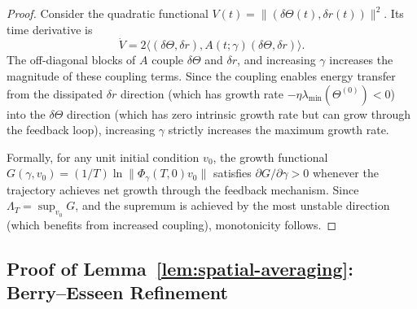 \documentclass[11pt]{article}
\theoremstyle{definition}
\newcommand{\norm}[1]{\lVert #1 \rVert}
\newcommand{\ip}[2]{\langle #1, #2 \rangle}
\newcommand{\pp}{\partial}
\renewcommand{\Theta}{\varTheta}
\begin{document}
\begin{proof}
Consider the quadratic functional $V(t) = \norm{(\delta\Theta(t), \delta r(t))}^2$. Its time derivative is
\begin{equation}
\dot{V} = 2\ip{(\delta\Theta, \delta r)}{A(t;\gamma)(\delta\Theta, \delta r)}.
\end{equation}
The off-diagonal blocks of $A$ couple $\delta\Theta$ and $\delta r$, and increasing $\gamma$ increases the magnitude of these coupling terms. Since the coupling enables energy transfer from the dissipated $\delta r$ direction (which has growth rate $-\eta\lambda_{\min}(\Theta^{(0)}) < 0$) into the $\delta\Theta$ direction (which has zero intrinsic growth rate but can grow through the feedback loop), increasing $\gamma$ strictly increases the maximum growth rate.

Formally, for any unit initial condition $v_0$, the growth functional $G(\gamma, v_0) = (1/T)\ln\norm{\Phi_\gamma(T,0)v_0}$ satisfies $\pp G/\pp\gamma > 0$ whenever the trajectory achieves net growth through the feedback mechanism. Since $\Lambda_T = \sup_{v_0} G$, and the supremum is achieved by the most unstable direction (which benefits from increased coupling), monotonicity follows.
\end{proof}

\subsection{Proof of Lemma~\ref{lem:spatial-averaging}: Berry--Esseen Refinement}
\end{document}
